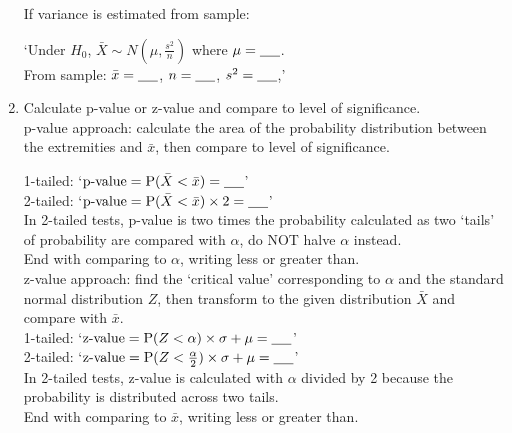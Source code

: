 \documentclass[../main]{subfiles}
\begin{document}
\begin{enumerate}
			If variance is estimated from sample: 

			`Under \(H_0\), \(\bar{X} \sim N \left( \mu, \frac{s^2}{n} \right) \) where \(\mu = \text{\underline{\hspace{0.5cm}}}\). \\ From sample: \(\bar{x} = \text{\underline{\hspace{0.5cm}}}\), \(n = \text{\underline{\hspace{0.5cm}}}\), \(s^2 = \text{\underline{\hspace{0.5cm}}}\),'\\

		\item Calculate p-value or z-value and compare to level of significance. \\

			p-value approach: calculate the area of the probability distribution between the extremities and \(\bar{x}\), then compare to level of significance.

			1-tailed: `\(\text{p-value} = \operatorname{P}(\bar{X} < \bar{x}) = \text{\underline{\hspace{0.5cm}}}\)'\\
			2-tailed: `\(\text{p-value} = \operatorname{P}(\bar{X} < \bar{x}) \times 2 = \text{\underline{\hspace{0.5cm}}}\)' \\
			In 2-tailed tests, p-value is two times the probability calculated as two `tails' of probability are compared with \(\alpha\), do NOT halve \(\alpha\) instead. \\
			End with comparing to \(\alpha\), writing less or greater than. \\

			z-value approach: find the `critical value' corresponding to \(\alpha\) and the standard normal distribution \(Z\), then transform to the given distribution \(\bar{X}\) and compare with \(\bar{x}\). \\
			1-tailed: `\(\text{z-value} = \operatorname{P}(Z < \alpha) \times \sigma + \mu = \text{\underline{\hspace{0.5cm}}}\)'\\
			2-tailed: `\(\text{z-value} = \operatorname{P}(Z < \frac{\alpha}{2}) \times \sigma + \mu = \text{\underline{\hspace{0.5cm}}}\)' \\
			In 2-tailed tests, z-value is calculated with \(\alpha\) divided by 2 because the probability is distributed across two tails. \\
			End with comparing to \(\bar{x}\), writing less or greater than. \\


\end{enumerate}
\end{document}
